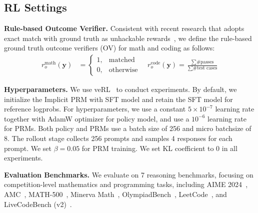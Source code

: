 \subsection{RL Settings}
\textbf{Rule-based Outcome Verifier.}
Consistent with recent research that adopts exact match with ground truth as unhackable rewards~\citep{Gao2024OnDE, Lambert2024TLU3P,deepseekai2025deepseekr1incentivizingreasoningcapability}, we define the rule-based ground truth outcome verifiers (OV) for math and coding as follows: 
\begin{align*}
r_o^{\text{math}}(\mathbf{y}) &= \begin{cases}1, &\text{matched} \\ 0,&\text{otherwise} \end{cases} \quad
r_o^{\text{code}}(\mathbf{y}) =\frac{\sum \text{\#passes}}{\sum \text{\#test cases}}
\end{align*}



\textbf{Hyperparameters.}
We use veRL~\citep{sheng2024hybridflow} to conduct experiments.
By default, we initialize the Implicit PRM with SFT model and retain the SFT model for reference logprobs. For hyperparameters, we use a constant $5\times 10^{-7}$ learning rate together with AdamW optimizer for policy model, and use a $10^{-6}$ learning rate for PRMs. Both policy and PRMs use a batch size of 256 and micro batchsize of 8. The rollout stage collects 256 prompts and samples 4 responses for each prompt. We set $\beta=0.05$ for PRM training. We set KL coefficient to 0 in all experiments.

\textbf{Evaluation Benchmarks.}
We evaluate on 7 reasoning benchmarks, focusing on competition-level mathematics and programming tasks, including AIME 2024~\citep{li2024numinamath}, AMC~\citep{li2024numinamath}, MATH-500~\citep{hendrycks2021measuring}, Minerva Math~\citep{lewkowycz2022solving}, OlympiadBench~\citep{he-etal-2024-olympiadbench}, LeetCode~\citep{guo2024deepseek}, and LiveCodeBench (v2)~\citep{jain2024livecodebench}.


